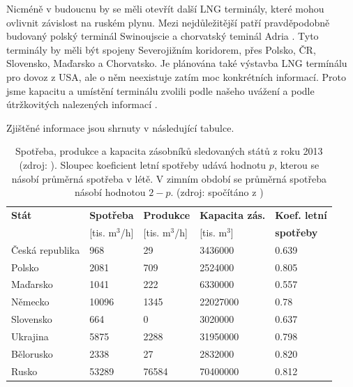 \documentclass[a4paper,12pt]{article}
\begin{document}
  Nicméně v budoucnu by se měli otevřít další LNG terminály, které mohou ovlivnit závislost na ruském plynu. Mezi 
  nejdůležitější patří pravděpodobně budovaný polský terminál Swinoujscie a chorvatský teminál Adria \cite{prouza}. Tyto terminály 
  by měli být spojeny Severojižním koridorem, přes Polsko, ČR, Slovensko, Maďarsko a Chorvatsko. Je plánována také 
  výstavba LNG termínálu pro dovoz z USA, ale o něm neexistuje zatím moc konkrétních informací. Proto jsme kapacitu a 
  umístění terminálu zvolili podle našeho uvážení a podle útržkovitých nalezených informací \cite{usa}.
  
  Zjištěné informace jsou shrnuty v následující tabulce.
  
  \begin{table}[h!]
  \centering
  \begin{tabular}{| l | l | l | l | l |}
    \hline
    \textbf{Stát} & \textbf{Spotřeba} & \textbf{Produkce} & \textbf{Kapacita zás.} & \textbf{Koef. letní}  \\ 
     & [tis. m$^3$/h] & [tis. m$^3$/h] & [tis. m$^3$] & \textbf{spotřeby} \\
    \hline\hline
    Česká republika & 968 & 29 & 3436000 & 0.639 \\ \hline
    Polsko & 2081 & 709 & 2524000 & 0.805 \\ \hline
    Maďarsko & 1041 & 222 & 6330000 & 0.557 \\ \hline
    Německo & 10096 & 1345 & 22027000 & 0.78 \\ \hline
    Slovensko & 664 & 0  & 3020000 & 0.637 \\ \hline
    Ukrajina & 5875 & 2288 & 31950000 & 0.798 \\ \hline
    Bělorusko & 2338 & 27 & 2832000 & 0.820 \\ \hline
    Rusko & 53289 & 76584 & 70400000 & 0.812 \\
    \hline
  \end{tabular}
  \caption{Spotřeba, produkce a kapacita zásobníků sledovaných států z roku 2013 (zdroj: \cite{info}). Sloupec koeficient letní spotřeby udává 
  hodnotu $p$, kterou se násobí průměrná spotřeba v létě. V zimním období se průměrná 
  spotřeba násobí hodnotou $2-p$. (zdroj: spočítáno z \cite{mapa1}) }
  \label{tab2}
  \end{table}
  
\end{document}
